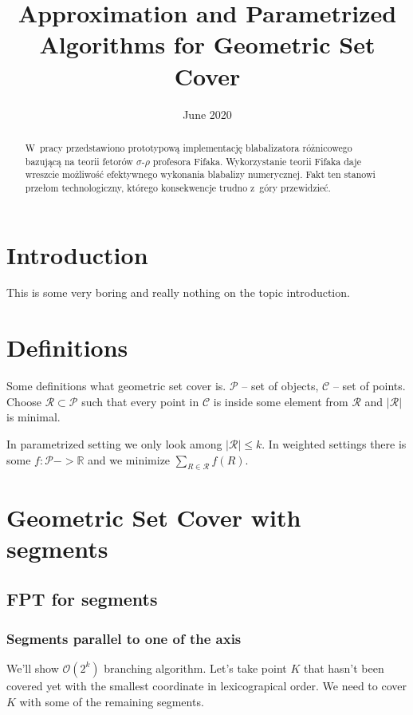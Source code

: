 \documentclass[en]{pracamgr}
\title{Approximation and Parametrized Algorithms for Geometric Set Cover}
\date{June 2020}
\newcommand{\points}{\mathcal{C}}
\newcommand{\sets}{\mathcal{P}}
\newcommand{\sol}{\mathcal{R}}
\begin{document}
\maketitle

\begin{abstract}
  W~pracy przedstawiono prototypową implementację blabalizatora
  różnicowego bazującą na teorii fetorów $\sigma$-$\rho$ profesora
  Fifaka.  Wykorzystanie teorii Fifaka daje wreszcie możliwość
  efektywnego wykonania blabalizy numerycznej.  Fakt ten stanowi
  przełom technologiczny, którego konsekwencje trudno z~góry
  przewidzieć.
\end{abstract}

\tableofcontents

\chapter{Introduction}
This is some very boring and really nothing on the topic introduction.
\chapter{Definitions}
Some definitions what geometric set cover is.
$\sets$ -- set of objects, $\points$ -- set of points.
Choose $\sol \subset \sets$ such that
every point in $\points$ is inside some element from $\sol$
and $|\sol|$ is minimal.

In parametrized setting we only look among $|\sol| \le k$.
In weighted settings there is some $f : \sets -> \mathbb{R}$
and we minimize $\sum_{R \in \sol} f(R)$.
 
\chapter{Geometric Set Cover with segments}

\section{FPT for segments}
\subsection{Segments parallel to one of the axis}
We'll show $\mathcal{O}(2^k)$ branching algorithm.
Let's take point $K$ that hasn't been covered yet with
the smallest coordinate in lexicograpical order.
We need to cover $K$ with some of the remaining segments.
\end{document}
